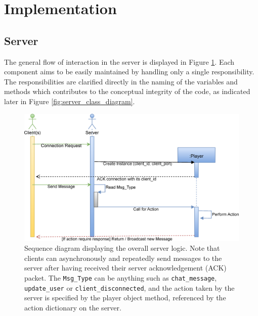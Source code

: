 \documentclass[bsc, 12pt, twoside, singlespacing, parskip, abbrevs, notimes, normalheadings, logo]{styles/infthesis}
\begin{document}
\section{Implementation}
\subsection{Server}
The general flow of interaction in the server is displayed in Figure \ref{fig:server_sequence_diagram}. Each component aims to be easily maintained by handling only a single responsibility. The responsibilities are clarified directly in the naming of the variables and methods which contributes to the conceptual integrity of the code, as indicated later in Figure \ref{fig:server_class_diagram}.

\begin{figure}[H]
\includegraphics[scale=0.3]{images/server_sequence_diagram2.eps}
\caption{Sequence diagram displaying the overall server logic. Note that clients can asynchronously and repeatedly send messages to the server after having received their server acknowledgement (ACK) packet. The \texttt{Msg\_Type} can be anything such as \texttt{chat\_message}, \texttt{update\_user} or \texttt{client\_disconnected}, and the action taken by the server is specified by the player object method, referenced by the action dictionary on the server.}
\label{fig:server_sequence_diagram}
\end{figure}
\end{document}
